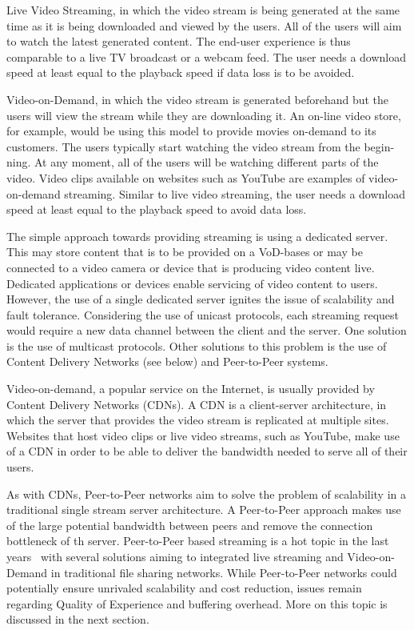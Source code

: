Live Video Streaming, in which the video stream is being generated at the same
time as it is being downloaded and viewed by the users. All of the users will
aim to watch the latest generated content. The end-user experience is thus
comparable to a live TV broadcast or a webcam feed. The user needs a download
speed at least equal to the playback speed if data loss is to be avoided.

Video-on-Demand, in which the video stream is generated beforehand but the
users will view the stream while they are downloading it. An on-line video
store, for example, would be using this model to provide movies on-demand to
its customers. The users typically start watching the video stream from the
begin- ning. At any moment, all of the users will be watching different parts
of the video. Video clips available on websites such as YouTube are examples
of video-on-demand streaming. Similar to live video streaming, the user needs
a download speed at least equal to the playback speed to avoid data loss.

The simple approach towards providing streaming is using a dedicated server.
This may store content that is to be provided on a VoD-bases or may be
connected to a video camera or device that is producing video content live.
Dedicated applications or devices enable servicing of video content to users.
However, the use of a single dedicated server ignites the issue of scalability
and fault tolerance. Considering the use of unicast protocols, each streaming
request would require a new data channel between the client and the server.
One solution is the use of multicast protocols. Other solutions to this
problem is the use of Content Delivery Networks (see below) and Peer-to-Peer
systems.

Video-on-demand, a popular service on the Internet, is usually provided by
Content Delivery Networks (CDNs). A CDN is a client-server architecture, in
which the server that provides the video stream is replicated at multiple
sites. Websites that host video clips or live video streams, such as YouTube,
make use of a CDN in order to be able to deliver the bandwidth needed to serve
all of their users.

As with CDNs, Peer-to-Peer networks aim to solve the problem of scalability in
a traditional single stream server architecture. A Peer-to-Peer approach makes
use of the large potential bandwidth between peers and remove the connection
bottleneck of th server. Peer-to-Peer based streaming is a hot topic in the
last years~\cite{p2p-streaming-survey} with several solutions aiming to integrated live
streaming and Video-on-Demand in traditional file sharing networks. While
Peer-to-Peer networks could potentially ensure unrivaled scalability and cost
reduction, issues remain regarding Quality of Experience and buffering
overhead. More on this topic is discussed in the next section.

